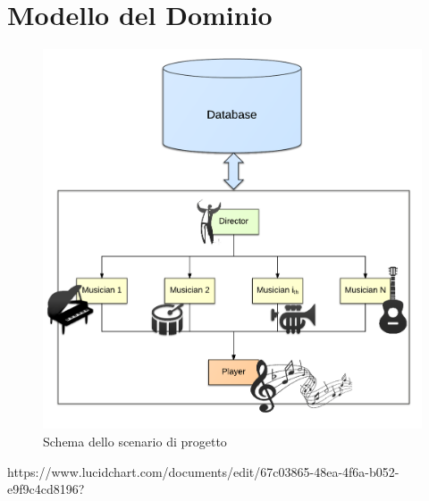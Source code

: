 \section{Modello del Dominio}
\begin{figure}[H]
\centering
\includegraphics[scale=0.30]{img/model.png}
\caption{Schema dello scenario di progetto}
\end{figure}

https://www.lucidchart.com/documents/edit/67c03865-48ea-4f6a-b052-e9f9c4cd8196?
